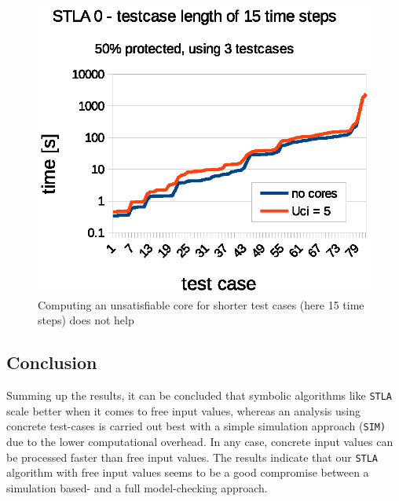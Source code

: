 \documentclass[a4paper,10pt]{article}
\begin{document}
\begin{figure}[!htb]
\centering
\includegraphics[scale = 0.64]{img/uci-15ts.eps}
\centering \caption{Computing an unsatisfiable core for shorter test cases (here 15 time steps) does not help} 
\label{uci-15ts}
\end{figure}



\newpage
\subsection{Conclusion}
Summing up the results, it can be concluded that symbolic algorithms like \texttt{STLA} scale better when it comes to free input values, whereas an analysis using concrete test-cases is carried out best with 
a simple simulation approach (\texttt{SIM)} due to the lower computational overhead. In any case, concrete input values can be processed faster than free input values.
The results indicate that our \texttt{STLA} algorithm with free input values seems to be a good compromise between a simulation based- and a full model-checking approach.
\end{document}
